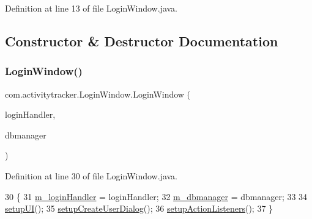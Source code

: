 Definition at line 13 of file Login\+Window.\+java.



\subsection{Constructor \& Destructor Documentation}
\mbox{\label{classcom_1_1activitytracker_1_1_login_window_a78c4da2fb8767f2645d1e3681e77cae7}} 
\subsubsection{\texorpdfstring{Login\+Window()}{LoginWindow()}}
{\footnotesize\ttfamily com.\+activitytracker.\+Login\+Window.\+Login\+Window (\begin{DoxyParamCaption}\item[{java.\+util.\+function.\+Consumer$<$ \mbox{\hyperlink{classcom_1_1activitytracker_1_1_user}{User}} $>$}]{login\+Handler,  }\item[{\mbox{\hyperlink{classcom_1_1activitytracker_1_1_d_b_manager}{D\+B\+Manager}}}]{dbmanager }\end{DoxyParamCaption})\hspace{0.3cm}{\ttfamily [package]}}



Definition at line 30 of file Login\+Window.\+java.


\begin{DoxyCode}
30                                                                                      \{
31         \mbox{\hyperlink{classcom_1_1activitytracker_1_1_login_window_a9b7d3aa9c6a7cf67e78606c24e21109c}{m\_loginHandler}} = loginHandler;
32         \mbox{\hyperlink{classcom_1_1activitytracker_1_1_login_window_a1d278c8158f803151737943e9ea2a9bf}{m\_dbmanager}} = dbmanager;
33 
34         \mbox{\hyperlink{classcom_1_1activitytracker_1_1_login_window_a7af9edf52b3028437e2159f0be9893a9}{setupUI}}();
35         \mbox{\hyperlink{classcom_1_1activitytracker_1_1_login_window_a567db7b15448fe9d9c76addbcee4092b}{setupCreateUserDialog}}();
36         \mbox{\hyperlink{classcom_1_1activitytracker_1_1_login_window_af1ff236b841c51bfb49e143344a3c3ac}{setupActionListeners}}();
37     \}
\end{DoxyCode}


